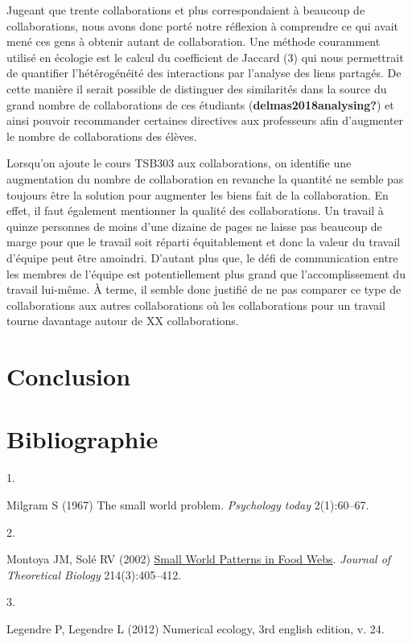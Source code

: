 \documentclass[9pt,twocolumn,twoside,]{pnas-new}
\newlength{\cslhangindent}
\newlength{\csllabelwidth}
\newlength{\cslentryspacingunit} %
\newenvironment{CSLReferences}[2] %
 {%
  \setlength{\parindent}{0pt}
  \ifodd #1
  \let\oldpar\par
  \def\par{\hangindent=\cslhangindent\oldpar}
  \fi
  \setlength{\parskip}{#2\cslentryspacingunit}
 }%
 {}
\newcommand{\CSLLeftMargin}[1]{\parbox[t]{\csllabelwidth}{#1}}
\newcommand{\CSLRightInline}[1]{\parbox[t]{\linewidth - \csllabelwidth}{#1}\break}
\begin{document}
Jugeant que trente collaborations et plus correspondaient à beaucoup de
collaborations, nous avons donc porté notre réflexion à comprendre ce
qui avait mené ces gens à obtenir autant de collaboration. Une méthode
couramment utilisé en écologie est le calcul du coefficient de Jaccard
(3) qui nous permettrait de quantifier l'hétérogénéité des interactions
par l'analyse des liens partagés. De cette manière il serait possible de
distinguer des similarités dans la source du grand nombre de
collaborations de ces étudiants (\textbf{delmas2018analysing?}) et ainsi
pouvoir recommander certaines directives aux professeurs afin
d'augmenter le nombre de collaborations des élèves.

Lorsqu'on ajoute le cours TSB303 aux collaborations, on identifie une
augmentation du nombre de collaboration en revanche la quantité ne
semble pas toujours être la solution pour augmenter les biens fait de la
collaboration. En effet, il faut également mentionner la qualité des
collaborations. Un travail à quinze personnes de moins d'une dizaine de
pages ne laisse pas beaucoup de marge pour que le travail soit réparti
équitablement et donc la valeur du travail d'équipe peut être amoindri.
D'autant plus que, le défi de communication entre les membres de
l'équipe est potentiellement plus grand que l'accomplissement du travail
lui-même. À terme, il semble donc justifié de ne pas comparer ce type de
collaborations aux autres collaborations où les collaborations pour un
travail tourne davantage autour de XX collaborations.

\hypertarget{conclusion}{%
\section{Conclusion}\label{conclusion}}

\newpage

\hypertarget{bibliographie}{%
\section*{Bibliographie}\label{bibliographie}}

\hypertarget{refs}{}
\begin{CSLReferences}{0}{0}
\leavevmode{}%
\CSLLeftMargin{1. }
\CSLRightInline{Milgram S (1967) The small world problem.
\emph{Psychology today} 2(1):60--67.}

\leavevmode{}%
\CSLLeftMargin{2. }
\CSLRightInline{Montoya JM, Solé RV (2002)
\href{https://doi.org/10.1006/jtbi.2001.2460}{Small {World} {Patterns}
in {Food} {Webs}}. \emph{Journal of Theoretical Biology}
214(3):405--412.}

\leavevmode{}%
\CSLLeftMargin{3. }
\CSLRightInline{Legendre P, Legendre L (2012) Numerical ecology, 3rd
english edition, v. 24.}

\end{CSLReferences}



% 
\end{document}
